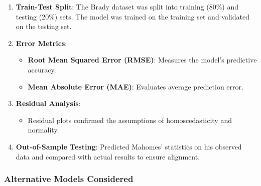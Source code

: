 \documentclass[
  letterpaper,
  DIV=11,
  numbers=noendperiod]{scrartcl}
\providecommand{\tightlist}{%
  \setlength{\itemsep}{0pt}\setlength{\parskip}{0pt}}\usepackage{longtable,booktabs,array}
\begin{document}
\begin{enumerate}
\def\labelenumi{\arabic{enumi}.}
\tightlist
\item
  \textbf{Train-Test Split}: The Brady dataset was split into training
  (80\%) and testing (20\%) sets. The model was trained on the training
  set and validated on the testing set.\\
\item
  \textbf{Error Metrics}:

  \begin{itemize}
  \tightlist
  \item
    \textbf{Root Mean Squared Error (RMSE)}: Measures the model's
    predictive accuracy.\\
  \item
    \textbf{Mean Absolute Error (MAE)}: Evaluates average prediction
    error.\\
  \end{itemize}
\item
  \textbf{Residual Analysis}:

  \begin{itemize}
  \tightlist
  \item
    Residual plots confirmed the assumptions of homoscedasticity and
    normality.\\
  \end{itemize}
\item
  \textbf{Out-of-Sample Testing}: Predicted Mahomes' statistics on his
  observed data and compared with actual results to ensure alignment.
\end{enumerate}

\subsubsection{Alternative Models
Considered}\label{alternative-models-considered}
\end{document}
